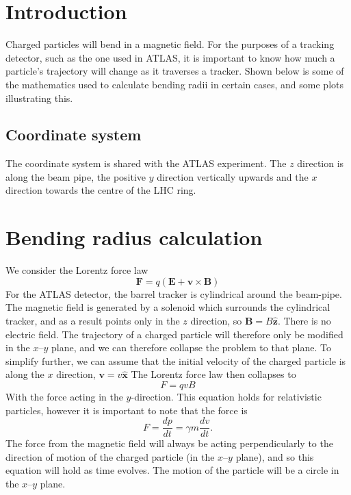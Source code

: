 \documentclass[a4paper, 12pt]{article}
\begin{document}
\section{Introduction}
Charged particles will bend in a magnetic field. 
For the purposes of a tracking detector, such as the one used in ATLAS, it is important to know how much a particle's trajectory will change as it traverses a tracker. 
Shown below is some of the mathematics used to calculate bending radii in certain cases, and some plots illustrating this.  

\subsection{Coordinate system}
The coordinate system is shared with the ATLAS experiment. 
The $z$ direction is along the beam pipe, the positive $y$ direction vertically upwards and the $x$ direction towards the centre of the LHC ring. 

\section{Bending radius calculation}
We consider the Lorentz force law
\begin{equation}
  \mathbf{F} = q( \mathbf{E} + \mathbf{v} \times \mathbf{B})
\end{equation}
For the ATLAS detector, the barrel tracker is cylindrical around the beam-pipe. 
The magnetic field is generated by a solenoid which surrounds the cylindrical tracker, and as a result points only in the $z$ direction, so 
$\mathbf{B} = B \mathbf{\hat{z}}$. 
There is no electric field. 
The trajectory of a charged particle will therefore only be modified in the $x$--$y$ plane, and we can therefore collapse the problem to that plane. 
To simplify further, we can assume that the initial velocity of the charged particle is along the $x$ direction, $\mathbf{v} = v \mathbf{\hat{x}}$
The Lorentz force law then collapses to
\begin{equation}
  F  = qvB
\end{equation}
With the force acting in the $y$-direction. 
This equation holds for relativistic particles, however it is important to note that the force is
\begin{equation}
  F = \frac{dp}{dt} = \gamma m \frac{dv}{dt}.
\end{equation}
The force from the magnetic field will always be acting perpendicularly to the direction of motion of the charged particle (in the $x$--$y$ plane), and so this equation will hold as time evolves. 
The motion of the particle will be a circle in the $x$--$y$ plane. 
\end{document}
